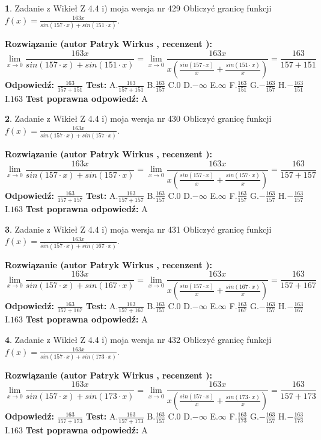 \documentclass[12pt, a4paper]{article}
\theoremstyle{definition} %
\newtheorem{zad}{}
\newcommand{\zadStart}[1]{\begin{zad}#1\newline}
\newcommand{\zadStop}{\end{zad}}
\newcommand{\rozwStart}[2]{\noindent \textbf{Rozwiązanie (autor #1 , recenzent #2): }\newline}
\newcommand{\rozwStop}{\newline}
\newcommand{\odpStart}{\noindent \textbf{Odpowiedź:}\newline}
\newcommand{\odpStop}{\newline}
\newcommand{\testStart}{\noindent \textbf{Test:}\newline}
\newcommand{\testStop}{\newline}
\newcommand{\kluczStart}{\noindent \textbf{Test poprawna odpowiedź:}\newline}
\newcommand{\kluczStop}{\newline}
\begin{document}
\zadStart{Zadanie z Wikieł Z 4.4 i) moja wersja nr 429}
Obliczyć granicę funkcji $f(x)=\frac{163x}{sin(157\cdot x) +sin(151\cdot x)}$.
\zadStop
\rozwStart{Patryk Wirkus}{}
$$\lim\limits_{x\to 0}\frac{163x}{sin(157\cdot x) +sin(151\cdot x)}=\lim\limits_{x\to 0}\frac{163x}{x(\frac{sin(157\cdot x)}{x}+\frac{sin(151\cdot x)}{x})}=\frac{163}{157+151}$$
\rozwStop
\odpStart
$\frac{163}{157+151}$
\odpStop
\testStart
A.$\frac{163}{157+151}$
B.$\frac{163}{157}$
C.$0$
D.$-\infty$
E.$\infty$
F.$\frac{163}{151}$
G.$-\frac{163}{157}$
H.$-\frac{163}{151}$
I.$163$
\testStop
\kluczStart
A
\kluczStop



\zadStart{Zadanie z Wikieł Z 4.4 i) moja wersja nr 430}
Obliczyć granicę funkcji $f(x)=\frac{163x}{sin(157\cdot x) +sin(157\cdot x)}$.
\zadStop
\rozwStart{Patryk Wirkus}{}
$$\lim\limits_{x\to 0}\frac{163x}{sin(157\cdot x) +sin(157\cdot x)}=\lim\limits_{x\to 0}\frac{163x}{x(\frac{sin(157\cdot x)}{x}+\frac{sin(157\cdot x)}{x})}=\frac{163}{157+157}$$
\rozwStop
\odpStart
$\frac{163}{157+157}$
\odpStop
\testStart
A.$\frac{163}{157+157}$
B.$\frac{163}{157}$
C.$0$
D.$-\infty$
E.$\infty$
F.$\frac{163}{157}$
G.$-\frac{163}{157}$
H.$-\frac{163}{157}$
I.$163$
\testStop
\kluczStart
A
\kluczStop



\zadStart{Zadanie z Wikieł Z 4.4 i) moja wersja nr 431}
Obliczyć granicę funkcji $f(x)=\frac{163x}{sin(157\cdot x) +sin(167\cdot x)}$.
\zadStop
\rozwStart{Patryk Wirkus}{}
$$\lim\limits_{x\to 0}\frac{163x}{sin(157\cdot x) +sin(167\cdot x)}=\lim\limits_{x\to 0}\frac{163x}{x(\frac{sin(157\cdot x)}{x}+\frac{sin(167\cdot x)}{x})}=\frac{163}{157+167}$$
\rozwStop
\odpStart
$\frac{163}{157+167}$
\odpStop
\testStart
A.$\frac{163}{157+167}$
B.$\frac{163}{157}$
C.$0$
D.$-\infty$
E.$\infty$
F.$\frac{163}{167}$
G.$-\frac{163}{157}$
H.$-\frac{163}{167}$
I.$163$
\testStop
\kluczStart
A
\kluczStop



\zadStart{Zadanie z Wikieł Z 4.4 i) moja wersja nr 432}
Obliczyć granicę funkcji $f(x)=\frac{163x}{sin(157\cdot x) +sin(173\cdot x)}$.
\zadStop
\rozwStart{Patryk Wirkus}{}
$$\lim\limits_{x\to 0}\frac{163x}{sin(157\cdot x) +sin(173\cdot x)}=\lim\limits_{x\to 0}\frac{163x}{x(\frac{sin(157\cdot x)}{x}+\frac{sin(173\cdot x)}{x})}=\frac{163}{157+173}$$
\rozwStop
\odpStart
$\frac{163}{157+173}$
\odpStop
\testStart
A.$\frac{163}{157+173}$
B.$\frac{163}{157}$
C.$0$
D.$-\infty$
E.$\infty$
F.$\frac{163}{173}$
G.$-\frac{163}{157}$
H.$-\frac{163}{173}$
I.$163$
\testStop
\kluczStart
A
\kluczStop
\end{document}

